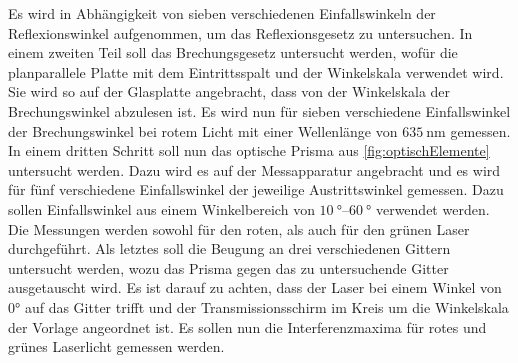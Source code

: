 \noindent
Es wird in Abhängigkeit von sieben verschiedenen Einfallswinkeln der Reflexionswinkel aufgenommen, um das Reflexionsgesetz zu untersuchen. \newline
In einem zweiten Teil soll das Brechungsgesetz untersucht werden, wofür die planparallele Platte mit dem Eintrittsspalt und der Winkelskala verwendet wird. Sie wird so auf der Glasplatte angebracht, dass von der Winkelskala der Brechungswinkel abzulesen ist.
Es wird nun für sieben verschiedene Einfallswinkel der Brechungswinkel bei rotem Licht mit einer Wellenlänge von $\SI{635}{\nano\metre}$ gemessen. \newline
In einem dritten Schritt soll nun das optische Prisma aus \autoref{fig:optischElemente} untersucht werden. Dazu wird es auf der Messapparatur angebracht und es wird für fünf verschiedene Einfallswinkel der
jeweilige Austrittswinkel gemessen. Dazu sollen Einfallswinkel aus einem Winkelbereich von $\SIrange{10}{60}{\degree}$ verwendet werden. Die Messungen werden sowohl für den roten,
als auch für den grünen Laser durchgeführt.\newline
Als letztes soll die Beugung an drei verschiedenen Gittern untersucht werden, wozu das Prisma gegen das zu untersuchende Gitter ausgetauscht wird. Es ist darauf zu achten, dass der Laser bei einem Winkel von $0°$ auf das
Gitter trifft und der Transmissionsschirm im Kreis um die Winkelskala der Vorlage angeordnet ist. Es sollen nun die Interferenzmaxima für rotes und grünes Laserlicht gemessen werden.